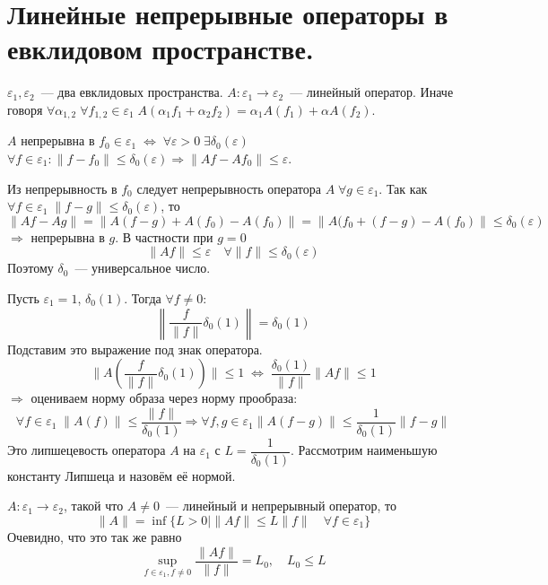 \documentclass[14pt]{extarticle}
\begin{document}
\section*{Линейные непрерывные операторы в евклидовом пространстве.}

$\varepsilon_1, \varepsilon_2$~--- два евклидовых пространства.
$A : \varepsilon_1 \to \varepsilon_2$~--- линейный оператор.
Иначе говоря $\forall \alpha_{1, 2}\; \forall f_{1, 2} \in \varepsilon_1\; A(\alpha_1 f_1 + \alpha_2 f_2) = \alpha_1 A(f_1) + \alpha A(f_2)$.

\begin{Opr}
    $A$ непрерывна в $f_0 \in \varepsilon_1\; \Leftrightarrow\; \forall \varepsilon > 0\; \exists \delta_0(\varepsilon)$
    $\forall f \in \varepsilon_1\colon \|f - f_0\| \le \delta_0(\varepsilon) \Rightarrow  \|Af-Af_0\| \le \varepsilon$.
\end{Opr}

Из непрерывность в $f_0$ следует непрерывность оператора $A\; \forall g \in \varepsilon_1$.
Так как $\forall f \in \varepsilon_1\; \|f - g\| \le \delta_0(\varepsilon)$, то 
$$
\|Af - Ag\| = \|A(f - g) + A(f_0) - A(f_0)\| = \|A(f_0 + (f - g)
- A(f_0)\| \le \delta_0(\varepsilon)
$$
$\Rightarrow$ непрерывна в $g$.
В частности при $g = 0$
$$
\|Af\| \le \varepsilon\quad \forall \|f\| \le \delta_0(\varepsilon)
$$
Поэтому $\delta_0$~--- универсальное число.

Пусть $\varepsilon_1 = 1$, $\delta_0(1)$.
Тогда $\forall f \ne 0$:
$$
\left \| \dfrac{f}{\|f\|}\delta_0(1)\right \| = \delta_0(1)
$$
Подставим это выражение под знак оператора.
$$
\|A(\dfrac{f}{\|f\|}\delta_0(1))\| \le 1\; \Leftrightarrow\; \dfrac{\delta_0(1)}{\|f\|}\|Af\| \le 1
$$
$\Rightarrow$ оцениваем норму образа через норму
прообраза:
$$
\forall f \in \varepsilon_1\; \|A(f)\| \le \dfrac{\|f\|}{\delta_0(1)} \Rightarrow  \forall f,g \in \varepsilon_1 \|A(f-g)\| \le \dfrac{1}{\delta_0(1)}\|f - g\|
$$
Это липшецевость оператора $A$ на $\varepsilon_1$ с $L=\dfrac{1}{\delta_0(1)}$.
Рассмотрим наименьшую константу Липшеца и назовём её нормой.


\begin{Opr}
    $A : \varepsilon_1 \to \varepsilon_2$, такой что $A \ne 0$~--- линейный и непрерывный оператор, то
    $$
    \|A\| = \inf\{L > 0 \mid \|Af\| \le L\|f\| \quad \forall f \in \varepsilon_1\}
    $$
    Очевидно, что это так же равно
    $$
    \sup\limits_{f \in \varepsilon_1, f \ne 0} \dfrac {\|Af\|}{\|f\|}=L_0,\quad L_0 \le L
    $$
\end{Opr}
\end{document}
